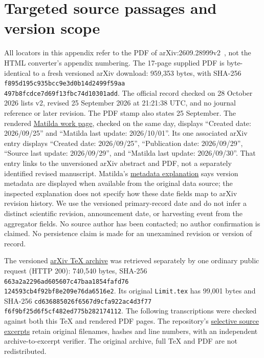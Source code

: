 \section{Targeted source passages and version scope}
\label{app:source-evidence}

All locators in this appendix refer to the PDF of
arXiv:2609.28999v2~\cite{original}, not the HTML converter's appendix numbering.
The 17-page supplied PDF is byte-identical to a fresh versioned arXiv download:
959,353 bytes, with SHA-256
\texttt{f895d195c935bcc9e3d0b14d2499f59aa}\\
\texttt{497b8fcdce7d69f13fbc74d10301add}.
The official record checked on 28 October 2026 lists v2, revised
25 September 2026 at 21:21:38 UTC, and no journal reference or later revision.
The PDF stamp also states 25 September. The rendered
\href{https://matilda.science/work/e0280fa0-9dbb-4f04-8567-6b3b05efadff?l=en}{Matilda work page},
checked on the same day, displays ``Created date: 2026/09/25'' and
``Matilda last update: 2026/10/01''. Its one associated arXiv entry displays
``Created date: 2026/09/25'', ``Publication date: 2026/09/29'',
``Source last update: 2026/09/29'', and ``Matilda last update: 2026/09/30''.
That entry links to the unversioned arXiv abstract and PDF, not a separately
identified revised manuscript. Matilda's
\href{https://matilda.science/faq#i206}{metadata explanation} says version
metadata are displayed when available from the original data source; the
inspected explanation does not specify how these date fields map to arXiv
revision history. We use the versioned primary-record date and do not infer a
distinct scientific revision, announcement date, or harvesting event from the
aggregator fields. No source author has been contacted; no author confirmation
is claimed.
No persistence claim is made for an unexamined revision or version of record.

The versioned \href{https://arxiv.org/src/2609.28999v2}{arXiv TeX archive}
was retrieved separately by one ordinary public request (HTTP 200):
740,540 bytes, SHA-256
\texttt{663a2a2296ad605607c47baa1854fafd76}\\
\texttt{124593cb4f92bf8e209e76da6516e2}.
Its original \texttt{Limit.tex} has 99,001 bytes and SHA-256
\texttt{cd636885026f6567d9cfa922ac4d3f77}\\
\texttt{f6f9bf25d6f5cf482ed775b282174112}.
The following transcriptions were checked against both this TeX and rendered
PDF pages. The repository's
\href{https://github.com/Teylersf/koopman-embedding-corrections/tree/main/source-excerpts}{selective source excerpts}
retain original filenames, hashes and line numbers, with an independent
archive-to-excerpt verifier. The original archive, full TeX and PDF are not
redistributed.

